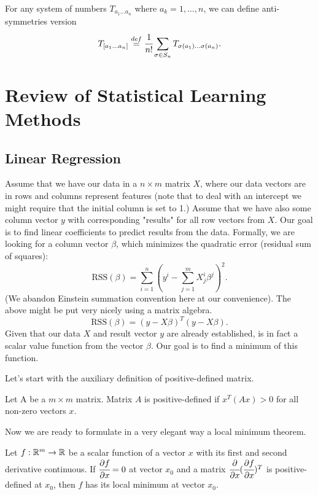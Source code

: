 \documentclass[main.tex]{subfiles}
\begin{document}
For any system of numbers $T_{a_1 \dots a_n}$ where $a_k = 1, \dots, n$, we can define anti-symmetries version
\begin{equation}
T_{[a_1 \dots a_n]} \stackrel{def}{=} \cfrac{1}{n!}\sum_{\sigma\in S_n} T_{\sigma(a_1) \dots \sigma(a_n)}.
\end{equation} 

\section{Review of Statistical Learning Methods}
\subsection{Linear Regression}
Assume that we have our data in a $n\times m$ matrix $X$, where our data vectors are in rows and columns represent features (note that to deal with an intercept we might require that the initial column is set to 1.) Assume that we have also some column vector $y$ with corresponding "results" for all row vectors from $X$. Our goal is to find linear coefficients to predict results from the data. Formally, we are looking for a column vector $\beta$, which minimizes the quadratic error (residual sum of squares):
\begin{equation}
\text{RSS}(\beta) =
\sum_{i=1}^n(y^i - \sum_{j=1}^m X^i_j \beta^j)^2.
\end{equation}
(We abandon Einstein summation convention here at our convenience).
The above might be put very nicely using a matrix algebra.
\begin{equation}
    \text{RSS}(\beta) = (y - X\beta)^T(y - X\beta).
\end{equation}
Given that our data $X$ and result vector $y$ are already established,  is in fact a scalar value function from the vector $\beta$. Our goal is to find a minimum of this function.

Let's start with the auxiliary definition of positive-defined matrix.

\begin{definition}
Let A be a $m\times m$ matrix. Matrix $A$ is positive-defined if $x^T(Ax) > 0$ for all non-zero vectors $x$.
\end{definition}
Now we are ready to formulate in a very elegant way a local minimum theorem.

\begin{theorem}
\label{local_minimum}
Let $f:\mathbb{R}^m \to \mathbb{R}$ be a scalar function of a vector $x$ with its first and second derivative continuous. If $\cfrac{\partial f}{\partial x} = 0$ at vector $x_0$ and a matrix $\cfrac{\partial}{\partial x}(\cfrac{\partial f}{\partial x})^T$ is positive-defined at $x_0$, then $f$ has its local minimum at vector $x_0$.
\end{theorem}
\end{document}
